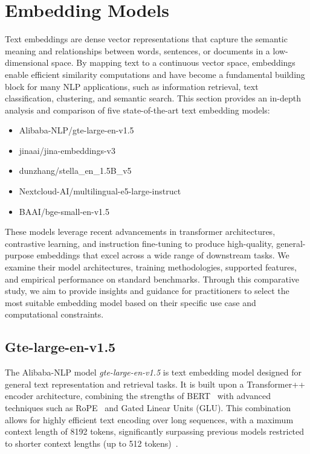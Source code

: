 \section{Embedding Models}\label{sec:embedding-models}
Text embeddings are dense vector representations that capture the semantic meaning and relationships between words, sentences, or documents in a low-dimensional space.
By mapping text to a continuous vector space, embeddings enable efficient similarity computations and have become a fundamental building block for many NLP applications, such as information retrieval, text classification, clustering, and semantic search.
This section provides an in-depth analysis and comparison of five state-of-the-art text embedding models:

\begin{itemize}
    \item Alibaba-NLP/gte-large-en-v1.5
    \item jinaai/jina-embeddings-v3
    \item dunzhang/stella\_en\_1.5B\_v5
    \item Nextcloud-AI/multilingual-e5-large-instruct
    \item BAAI/bge-small-en-v1.5
\end{itemize}

These models leverage recent advancements in transformer architectures, contrastive learning, and instruction fine-tuning to produce high-quality, general-purpose embeddings that excel across a wide range of downstream tasks.
We examine their model architectures, training methodologies, supported features, and empirical performance on standard benchmarks.
Through this comparative study, we aim to provide insights and guidance for practitioners to select the most suitable embedding model based on their specific use case and computational constraints.

\subsection{Gte-large-en-v1.5}\label{subsec:alibaba-nlp}
The Alibaba-NLP model \textit{gte-large-en-v1.5} is text embedding model designed for general text representation and retrieval tasks.
It is built upon a Transformer++ encoder architecture, combining the strengths of BERT~\cite{devlin2019bertpretrainingdeepbidirectional} with advanced techniques such as \ac{RoPE}~\cite{su2023roformerenhancedtransformerrotary} and Gated Linear Units (GLU).
This combination allows for highly efficient text encoding over long sequences, with a maximum context length of 8192 tokens, significantly surpassing previous models restricted to shorter context lengths (up to 512 tokens)~\cite{zhang2024mgtegeneralizedlongcontexttext}.


